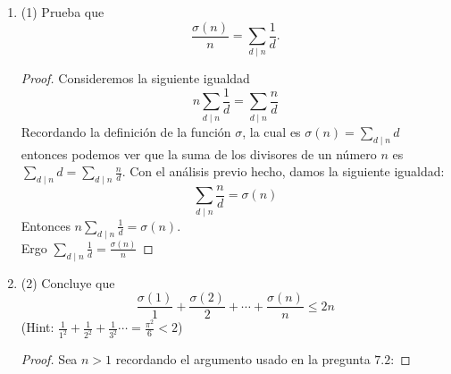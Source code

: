 \documentclass[12pt]{article}
\begin{document}
\begin{enumerate}
\begin{proof}
    Dado lo anterior tenemos que para cada $m_i$ el número de veces que aparece en la suma $\sigma(1)+\sigma(2)+\cdots+\sigma(n)$ tiene que ser 
    $q_i$, ya que $m_i$ divide a $m_i(1), m_i(2), \dots , m_i(q_i)$ y cada uno de esos terminos aparece en la suma  $\sigma(1)+\sigma(2)+\cdots+\sigma(n)$ por lo que $m_i$ aparece en $\sigma(m_i(1)), \sigma(m_i(2)), \dots, \sigma(m_i(q_i))$
    
    Por lo anterior podemos reescribir lo suma de la siguiente forma:
    
    \begin{equation}
        \sigma(1)+\sigma(2)+\cdots+\sigma(n) = 1(\frac{n}{1}) + 2(\frac{n}{2}) + 3(\frac{n}{3}) + \dots + n(\frac{n}{n})
    \end{equation}
    
    Donde $\frac{n}{m_i} = q_i$
    
    Notemos que si en cada termino en lugar de solo multiplicar por $q_i$ también sumamos el residuo $r_i$  la expresion toma la forma
    
    $ (1(\frac{n}{1}) + r_1) + (2(\frac{n}{2}) + r_2) + (3(\frac{n}{3}) + r_3) + \dots + (n(\frac{n}{n}) + r_n) = n + n + n + \dots + n (\text{n veces}) = n^2$
    
    
    Pero notemos que si algun $m_i$ no divide a $n$ entonces $m_i(\frac{n}{m_i}) = m_iq_i \leq m_iq_i + r_i = n$
    
    
    Por lo tanto $\sigma(1)+\sigma(2)+\cdots+\sigma(n)\leq n^2$ para toda $n>1$.
    
    
    \end{proof}

    \item(1) Prueba que
    \[
      \frac{\sigma(n)}{n}=\sum_{d\mid n}\frac{1}{d}.
    \]
    \begin{proof}
    Consideremos la siguiente igualdad
    $$n \sum_{d \mid n} \frac{1}{d} = \sum_{d \mid n} \frac{n}{d}$$
    Recordando la definición de la función $\sigma$, la cual es $\sigma(n) = \sum_{d \mid n} d$ 
    entonces podemos ver que la suma de los divisores de un número $n$ es 
    $\sum_{d \mid n} d = \sum_{d \mid n} \frac{n}{d}$.
    Con el análisis previo hecho, damos la siguiente igualdad:
    $$\sum_{d \mid n} \frac{n}{d} = \sigma(n)$$
    Entonces $n \sum_{d \mid n} \frac{1}{d} = \sigma(n)$.\\
    Ergo $\sum_{d \mid n} \frac{1}{d} = \frac{\sigma(n)}{n}$
    \end{proof}
    
  \item(2) Concluye que
    \[
      \frac{\sigma(1)}{1}+\frac{\sigma(2)}{2}+\cdots+\frac{\sigma(n)}{n}\leq 2n
    \]
    (Hint: $\frac{1}{1^2}+\frac{1}{2^2}+\frac{1}{3^2}\cdots =\frac{\pi^2}{6}<2$)
    \begin{proof}
    Sea $n > 1$ recordando el argumento usado en la pregunta $7$.$2$:
    

\end{proof}
\end{enumerate}
\end{document}

